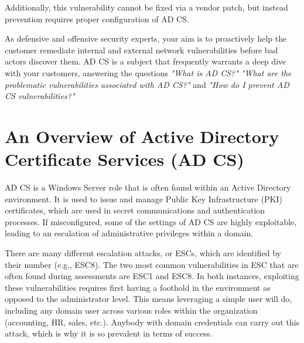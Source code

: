 Additionally, this vulnerability cannot be fixed via a vendor patch, but instead prevention requires proper configuration of AD CS.

As defensive and offensive security experts, your aim is to proactively help the customer remediate internal and external network vulnerabilities before bad actors discover them. AD CS is a subject that frequently warrants a deep dive with your customers, answering the questions \textit{"What is AD CS?" "What are the problematic vulnerabilities associated with AD CS?"} and \textit{"How do I prevent AD CS vulnerabilities?"}

\section{An Overview of Active Directory Certificate Services (AD CS)}
AD CS is a Windows Server role that is often found within an Active Directory environment. It is used to issue and manage Public Key Infrastructure (PKI) certificates, which are used in secret communications and authentication processes. If misconfigured, some of the settings of AD CS are highly exploitable, leading to an escalation of administrative privileges within a domain.

There are many different escalation attacks, or ESCs, which are identified by their number (e.g., ESC8). The two most common vulnerabilities in ESC that are often found during assessments are ESC1 and ESC8. In both instances, exploiting these vulnerabilities requires first having a foothold in the environment as opposed to the administrator level. This means leveraging a simple user will do, including any domain user across various roles within the organization (accounting, HR, sales, etc.). Anybody with domain credentials can carry out this attack, which is why it is so prevalent in terms of success.



